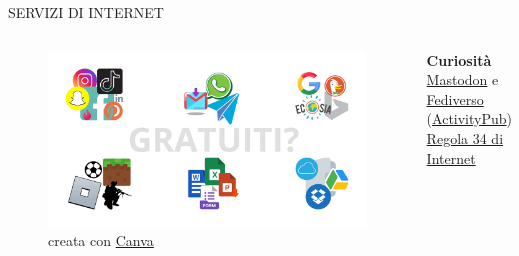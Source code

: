 \documentclass[aspectratio=1610]{beamer}
\begin{document}
\begin{frame}{SERVIZI DI INTERNET}
    \begin{columns}
        \begin{figure}
            \includegraphics[width=\linewidth]{img/servizi_Internet.png}
            \caption{{creata con \href{https://www.canva.com/}{Canva}}}
        \end{figure}
        \tiny{
            \textbf{Curiosità}\\
            \href{https://mastodon.it/}{Mastodon} e 
            \href{https://www.rsi.ch/web/podcast/il-disinformatico/Mastodon-e-fediverso-perch\%C3\%A9-se-ne-parla-cos\%C3\%AC-tanto--1600469.html}{Fediverso} 
            (\href{https://it.wikipedia.org/wiki/ActivityPub}{ActivityPub})\\
            \href{https://www.linkiesta.it/blog/2015/11/la-storia-della-regola-34-di-internet/}{Regola 34 di Internet}\\
        }
    \end{columns}
\end{frame}
\end{document}
